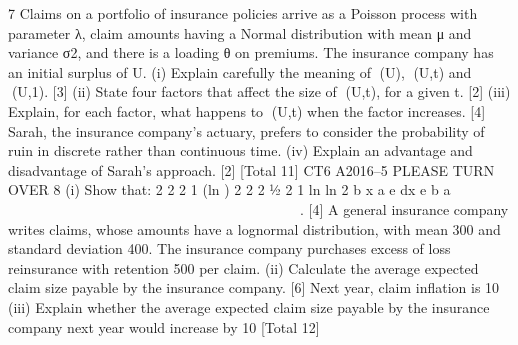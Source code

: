7 Claims on a portfolio of insurance policies arrive as a Poisson process with
parameter λ, claim amounts having a Normal distribution with mean μ and variance
σ2, and there is a loading θ on premiums. The insurance company has an initial
surplus of U.
(i) Explain carefully the meaning of (U), (U,t) and (U,1). [3]
(ii) State four factors that affect the size of (U,t), for a given t. [2]
(iii) Explain, for each factor, what happens to (U,t) when the factor increases. [4]
Sarah, the insurance company’s actuary, prefers to consider the probability of ruin
in discrete rather than continuous time.
(iv) Explain an advantage and disadvantage of Sarah’s approach. [2]
[Total 11]
CT6 A2016–5 PLEASE TURN OVER
8 (i) Show that:
  2
2 2
1 (ln ) 2 2
2 ½
2
1 ln ln
2
b x
a
e dx e b a
 
  
           
                
 . [4]
A general insurance company writes claims, whose amounts have a lognormal
distribution, with mean 300 and standard deviation 400. The insurance company
purchases excess of loss reinsurance with retention 500 per claim.
(ii) Calculate the average expected claim size payable by the insurance
company. [6]
Next year, claim inflation is 10%
(iii) Explain whether the average expected claim size payable by the insurance
company next year would increase by 10%
[Total 12]


